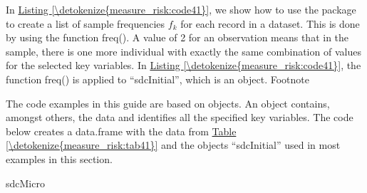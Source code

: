 \documentclass[letterpaper,10pt,english]{sphinxmanual}
\begin{document}
In \hyperref[\detokenize{measure_risk:code41}]{Listing \ref{\detokenize{measure_risk:code41}}}, we show how to use the  package to create a
list of sample frequencies \(f_{k}\) for each record in a dataset.
This is done by using the  function freq(). A value of 2 for
an observation means that in the sample, there is one more individual
with exactly the same combination of values for the selected key
variables. In \hyperref[\detokenize{measure_risk:code41}]{Listing \ref{\detokenize{measure_risk:code41}}}, the function freq() is applied to
“sdcInitial”, which is an  object. Footnote %
\begin{footnote}[5]\sphinxAtStartFootnote
The code examples in this guide are based on  objects. An
 object contains, amongst others, the data and identifies
all the specified key variables. The code below creates a data.frame
with the data from \hyperref[\detokenize{measure_risk:tab41}]{Table \ref{\detokenize{measure_risk:tab41}}} and the  objects “sdcInitial”
used in most examples in this section.

\sphinxSetupCodeBlockInFootnote
{}%
\begin{sphinxVerbatim}[commandchars=\\\{\}]
sdcMicro


\end{sphinxVerbatim}
\end{footnote}
\end{document}
